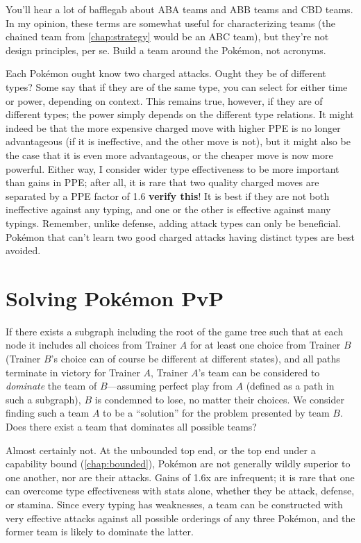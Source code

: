 \begin{tipbox}[title=Dubwool+Wooloo+Mareep is a BAA team]
You'll hear a lot of bafflegab about ABA teams and ABB teams and CBD teams.
  In my opinion, these terms are somewhat useful for characterizing teams
  (the chained team from \autoref{chap:strategy} would be an ABC team),
  but they're not design principles, per se.
Build a team around the Pokémon, not acronyms.
\end{tipbox}

Each Pokémon ought know two charged attacks.
Ought they be of different types?
Some say that if they are of the same type, you can select for either time or power, depending on context.
This remains true, however, if they are of different types; the power simply depends on
  the different type relations.
It might indeed be that the more expensive charged move with higher PPE is no
  longer advantageous (if it is ineffective, and the other move is not),
  but it might also be the case that it is even more advantageous,
  or the cheaper move is now more powerful.
Either way, I consider wider type effectiveness to be more important than gains in PPE;
  after all, it is rare that two quality charged moves are separated by a PPE factor
  of 1.6 \textbf{verify this}!
It is best if they are not both ineffective against any typing, and one or the
  other is effective against many typings.
Remember, unlike defense, adding attack types can only be beneficial.
Pokémon that can't learn two good charged attacks having distinct types are best avoided.

\section{Solving Pokémon PvP}
If there exists a subgraph including the root of the game tree such that at each
  node it includes all choices from Trainer $A$ for at least one choice from Trainer $B$
  (Trainer $B$'s choice can of course be different at different states), and all
  paths terminate in victory for Trainer $A$, Trainer $A$'s team can be considered
  to \textit{dominate} the team of $B$---assuming perfect play from $A$ (defined
  as a path in such a subgraph), $B$ is condemned to lose, no matter their choices.
We consider finding such a team $A$ to be a ``solution'' for the problem presented
  by team $B$.
Does there exist a team that dominates all possible teams?

Almost certainly not.
At the unbounded top end, or the top end under a capability bound (\autoref{chap:bounded}), Pokémon are not generally
  wildly superior to one another, nor are their attacks.
Gains of 1.6x are infrequent; it is rare that one can overcome type
  effectiveness with stats alone, whether they be attack, defense, or stamina.
Since every typing has weaknesses, a team can be constructed with
  very effective attacks against all possible orderings of any three Pokémon,
  and the former team is likely to dominate the latter.

